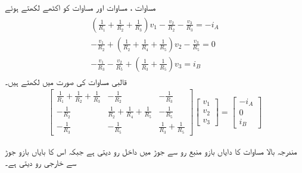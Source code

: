 مساوات ، مساوات  اور مساوات  کو اکٹھے لکھتے ہوئے
\begin{gather}
\begin{aligned}
\left(\frac{1}{R_1}+\frac{1}{R_2}+\frac{1}{R_3}\right)v_1-\frac{v_2}{R_2}- \frac{v_3}{R_3}=-i_A\\
-\frac{v_1}{R_2}+\left(\frac{1}{R_2}+\frac{1}{R_4}+\frac{1}{R_5}\right)v_2-\frac{v_3}{R_5}=0\\
-\frac{v_1}{R_3}-\frac{v_2}{R_5}+\left(\frac{1}{R_3}+\frac{1}{R_5}\right)v_3=i_B
\end{aligned}
\end{gather}
قالبی مساوات کی صورت میں لکھتے ہیں۔
\begin{align}\label{مساوات_جوڑ_آزاد_مساوات_دو_جوڑ_ب}
\begin{bmatrix}
\frac{1}{R_1}+\frac{1}{R_2}+\frac{1}{R_3} & -\frac{1}{R_2} &- \frac{1}{R_3}\\[6pt]
-\frac{1}{R_2}&\frac{1}{R_2}+\frac{1}{R_4}+\frac{1}{R_5}& -\frac{1}{R_5}\\[6pt]
-\frac{1}{R_3} & -\frac{1}{R_5}&\frac{1}{R_3}+\frac{1}{R_5}
\end{bmatrix}
\begin{bmatrix}
v_1\\[6pt]
v_2\\[6pt]
v_3
\end{bmatrix}
=
\begin{bmatrix}
-i_A\\[6pt]
0\\[6pt]
i_B
\end{bmatrix}
\end{align}

مندرجہ بالا مساوات کا دایاں بازو منبع رو سے جوڑ میں داخل رو دیتی ہے جبکہ اس کا بایاں بازو جوڑ سے خارجی رو دیتی ہے۔

